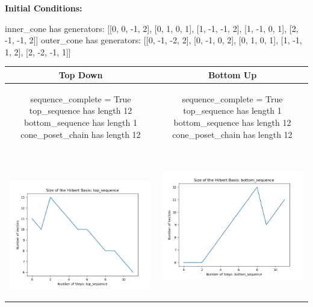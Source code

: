 \documentclass[10pt]{article}
\begin{document}
\textbf{Initial Conditions:}
\begin{SAGE}
inner_cone has generators: 
[[0, 0, -1, 2], [0, 1, 0, 1], [1, -1, -1, 2], [1, -1, 0, 1], [2, -1, -1, 2]]
outer_cone has generators: 
[[0, -1, -2, 2], [0, -1, 0, 2], [0, 1, 0, 1], [1, -1, 1, 2], [2, -2, -1, 1]]

\end{SAGE}
\begin{tabular}{c|c}
\textbf{Top Down} & \textbf{Bottom Up} \\ \hline  
\begin{SAGE}
	sequence_complete = True
	top_sequence has length 12
	bottom_sequence has length 1
	cone_poset_chain has length 12
\end{SAGE} 
&
\begin{SAGE}
	sequence_complete = True
	top_sequence has length 1
	bottom_sequence has length 12
	cone_poset_chain has length 12
\end{SAGE} 
\\ \hline
\
\begin{minipage}{.45\textwidth}
\includegraphics[width=\textwidth]{"DATA/4d/5 generators 2 bound E/top_sequence SIZE"}
\end{minipage} &
\begin{minipage}{.45\textwidth}
\includegraphics[width=\textwidth]{"DATA/4d/5 generators 2 bound E bottomup/bottom_sequence SIZE"}

\end{minipage}
\end{tabular}
\end{document}

